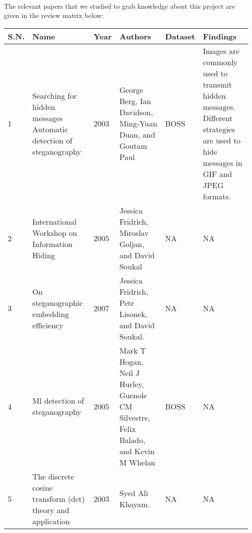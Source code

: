 \\The relevant papers that we studied to grab knowledge about this project are given in the review matrix below:
\begin{table}[!h]
        \begin{tabular}{|p{0.7cm}|p{3cm}|p{0.8cm}|p{3cm}|p{1.3cm}|p{3cm}|}
            \hline
        S.N. & Name                                                                            & Year & Authors                                                                                & Dataset          & Findings                                                                                                                                                                                          \\\hline
        1    & Searching for hidden messages Automatic detection of steganography              & 2003 & George Berg, Ian Davidson, Ming-Yuan Duan, and Goutam Paul                            & BOSS             & Images are commonly used to transmit hidden messages. Different strategies are used to hide messages in GIF and JPEG formats.                                                                     \\\hline
        2    & International Workshop on Information Hiding                                    & 2005 & Jessica Fridrich, Miroslav Goljan, and David Soukal                                    & NA               & NA                                                                                                                                                                                                \\\hline
        3    & On steganographic embedding efficiency                                          & 2007 & Jessica Fridrich, Petr Lisonek, and David Soukal.                                      & NA               & NA                                                                                                                                                                                                \\\hline
        4    & Ml detection of steganography                                                   & 2005 & Mark T Hogan, Neil J Hurley, Guenole CM Silvestre, Felix Balado, and Kevin M Whelan    & BOSS             & NA                                                                                                                                                                                                \\\hline
        5    & The discrete cosine transform (dct) theory and application                      & 2003 & Syed Ali   Khayam.                                                                     & NA               & NA                                                                                                                                                                                                \\\hline

        \end{tabular}
\end{table}

